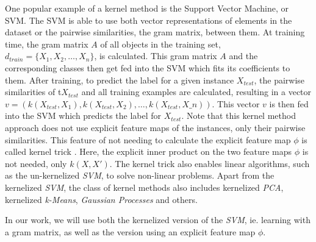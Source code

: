 One popular example of a kernel method is the Support Vector Machine, or SVM.
The SVM is able to use both vector representations of elements in the dataset or the pairwise similarities, the gram matrix, between them.
At training time, the gram matrix $A$ of all objects in the training set, $d_{train} = \{X_1, X_2, \ldots, X_n\}$, is calculated.
This gram matrix $A$ and the corresponding classes then get fed into the SVM which fits its coefficients to them.
After training, to predict the label for a given instance $X_{test}$, the pairwise similarities of t$X_{test}$ and all training examples are calculated, resulting in a vector $v = (k(X_{test}, X_1), k(X_{test}, X_2), \ldots, k(X_{test}, X\_n))$.
This vector $v$ is then fed into the SVM which predicts the label for $X_{test}$.
Note that this kernel method approach does not use explicit feature maps of the instances, only their pairwise similarities.
This feature of not needing to calculate the explicit feature map $\phi$ is called kernel trick \cite[p.~292]{Bishop2006}.
Here, the explicit inner product on the two feature maps $\phi$ is not needed, only $k(X, X')$.
The kernel trick also enables linear algorithms, such as the un-kernelized \textit{SVM}, to solve non-linear problems.
Apart from the kernelized \textit{SVM}, the class of kernel methods also includes kernelized \textit{PCA}, kernelized \textit{k-Means}, \textit{Gaussian Processes}\cite[p.~303]{Bishop2006} and others.

In our work, we will use both the kernelized version of the \textit{SVM}, ie. learning with a gram matrix, as well as the version using an explicit feature map $\phi$.



